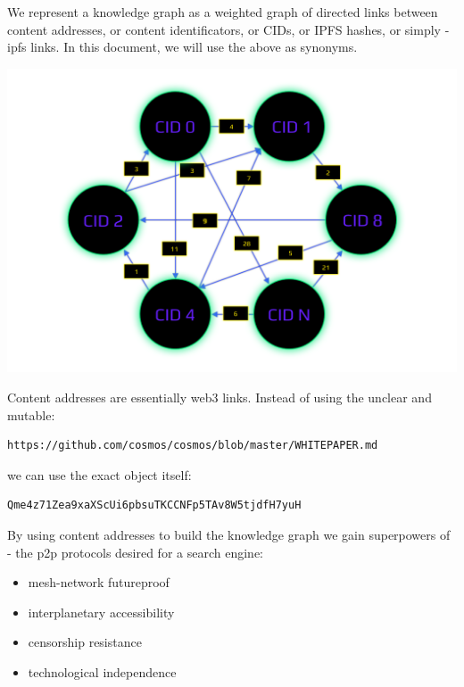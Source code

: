 \documentclass[8pt,oneside]{amsart}
\newcommand{\linkred}[2]{\href{#1}{\color{red}{#2}}}
\newcommand{\linkgreen}[2]{\href{#1}{\color{green}{#2}}}
\newenvironment{Figure}
  {\par\medskip\noindent\minipage{\linewidth}}
  {\endminipage\par\medskip}
\begin{document}
We represent a knowledge graph as a weighted graph of directed links between content addresses, or content identificators, or CIDs, or IPFS hashes, or simply - ipfs links. In this document, we will use the above as synonyms.

\begin{Figure}
    \centering
    \includegraphics[width=1\textwidth]{knowledge-graph.png}
\end{Figure}

Content addresses are essentially web3 links. Instead of using the unclear and mutable:
\begin{lstlisting}
https://github.com/cosmos/cosmos/blob/master/WHITEPAPER.md
\end{lstlisting}
we can use the exact object itself:
\begin{lstlisting}
Qme4z71Zea9xaXScUi6pbsuTKCCNFp5TAv8W5tjdfH7yuH
\end{lstlisting}

By using content addresses to build the knowledge graph we gain \linkred{https://steemit.com/web3/@hipster/an-idea-of-decentralized-search-for-web3-ce860d61defe5est}{the so much needed} superpowers of \linkgreen{https://ipfs.io/ipfs/QmV9tSDx9UiPeWExXEeH6aoDvmihvx6jD5eLb4jbTaKGps}{IPFS} - \linkgreen{https://ipfs.io/ipfs/QmXHGmfo4sjdHVW2MAxczAfs44RCpSeva2an4QvkzqYgfR}{like} the p2p protocols desired for a search engine:

\begin{itemize}
\item mesh-network futureproof
\item interplanetary accessibility
\item censorship resistance
\item technological independence
\end{itemize}
\end{document}
